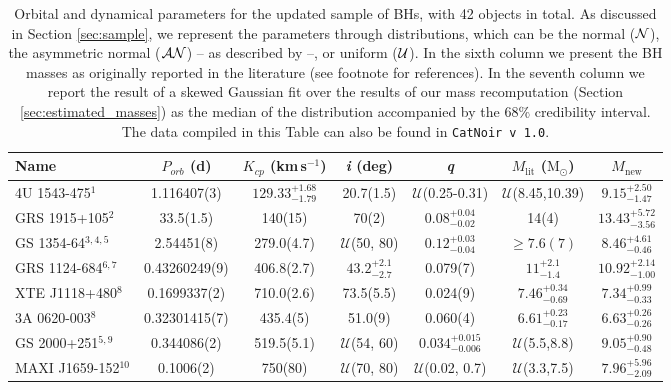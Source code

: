 \begin{table}[h]
\caption{Orbital and dynamical parameters for the updated sample of BHs, with 42 objects in total. As discussed in Section \ref{sec:sample}, we represent the parameters through distributions, which can be the normal (${\cal N}$), the asymmetric normal (${\cal AN}$) -- as described by  \citet{galaxiesBHs2023deSa} --, or uniform (${\cal U}$). In the sixth column we present the BH masses as originally reported in the literature (see footnote for references). In the seventh column we report the result of a skewed Gaussian fit over the results of our mass recomputation (Section \ref{sec:estimated_masses}) as the median of the distribution accompanied by the $68\%$ credibility interval. The data compiled in this Table can also be found in \texttt{CatNoir v 1.0}.}
\label{tab:list_BHs}
\centering
\scriptsize
\begin{threeparttable}
 {\begin{tabular}{|l c c c c c c|}
   \hline
   \hline
\textbf{Name} & \textbf{$P_{orb}$ (d)} & \textbf{$K_{cp}$ (km\,s$^{-1}$)}  & \textbf{\textit{i} (deg)} & \textbf{\textit{q}} & $M_\mathrm{lit}$ ($\mathrm{M}_\odot$) & $M_\mathrm{new}$ \\
\hline
4U 1543-475$^1$ & 1.116407(3) & $129.33^{+1.68}_{-1.79}$&  20.7(1.5) & $\mathcal{U}$(0.25-0.31) & $\mathcal{U}$(8.45,10.39) & $9.15_{-1.47}^{+2.50}$ \\ 
GRS 1915+105$^2$ &33.5(1.5) & 140(15) & 70(2) & $0.08^{+0.04}_{-0.02}$ & 14(4)& $13.43_{-3.56}^{+5.72}$ \\ 
GS 1354-64$^{3, 4, 5}$ & 2.54451(8) & 279.0(4.7) & $\mathcal{U}$(50, 80) & $0.12^{+0.03}_{-0.04}$  & $\geq 7.6(7)$ & $8.46_{-0.46}^{+4.61}$\\ 
GRS 1124-684$^{6, 7}$ & 0.43260249(9) & 406.8(2.7) & $43.2^{+2.1}_{-2.7}$ & 0.079(7)  & $11^{+2.1}_{-1.4}$ & $10.92_{-1.00}^{+2.14}$ \\ 
XTE J1118+480$^8$ & 0.1699337(2) & 710.0(2.6) & 73.5(5.5) & 0.024(9) & $7.46^{+0.34}_{-0.69}$ & $7.34_{-0.33}^{+0.99}$\\ 
3A 0620-003$^8$ & 0.32301415(7) & 435.4(5) & 51.0(9) & 0.060(4) & $6.61^{+0.23}_{-0.17}$ & $6.63_{-0.26}^{+0.26}$\\
GS 2000+251$^{5,9}$ & 0.344086(2) & 519.5(5.1) & $\mathcal{U}$(54, 60) & $0.034^{+0.015}_{-0.006}$ & $\mathcal{U}$(5.5,8.8) & $9.05_{-0.48}^{+0.90}$\\
MAXI J1659-152$^{10}$ & 0.1006(2) & 750(80) & $\mathcal{U}$(70, 80) & $\mathcal{U}$(0.02, 0.7)  & $\mathcal{U}$(3.3,7.5) & $7.96_{-2.09}^{+5.96}$ \\ 

\end{tabular}}
\end{threeparttable}
\end{table}
